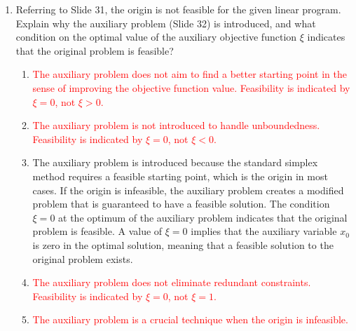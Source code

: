 \documentclass{article}%
\newcommand{\incorrect}[1]{\textcolor{red}{#1}}
\begin{document}
\begin{enumerate}
\begin{enumerate}
\begin{enumerate}
\item \incorrect{The coefficients of the non-basic variables are crucial for determining optimality in the simplex method.}%
\end{enumerate}%
\vspace{0.5em}%
\item Referring to Slide 31, the origin is not feasible for the given linear program. Explain why the auxiliary problem (Slide 32) is introduced, and what condition on the optimal value of the auxiliary objective function $ \xi $ indicates that the original problem is feasible?%
\begin{enumerate}%
\item \incorrect{The auxiliary problem does not aim to find a better starting point in the sense of improving the objective function value.  Feasibility is indicated by $ \xi = 0 $, not $ \xi > 0 $.}%
\item \incorrect{The auxiliary problem is not introduced to handle unboundedness.  Feasibility is indicated by $ \xi = 0 $, not $ \xi < 0 $.}%
\item The auxiliary problem is introduced because the standard simplex method requires a feasible starting point, which is the origin in most cases.  If the origin is infeasible, the auxiliary problem creates a modified problem that is guaranteed to have a feasible solution. The condition $ \xi = 0 $ at the optimum of the auxiliary problem indicates that the original problem is feasible.  A value of $ \xi = 0 $ implies that the auxiliary variable $ x_0 $ is zero in the optimal solution, meaning that a feasible solution to the original problem exists.%
\item \incorrect{The auxiliary problem does not eliminate redundant constraints.  Feasibility is indicated by $ \xi = 0 $, not $ \xi = 1 $.}%
\item \incorrect{The auxiliary problem is a crucial technique when the origin is infeasible.}%
\end{enumerate}%
\vspace{0.5em}%
\end{enumerate}%
\end{enumerate}

%
\end{document}
